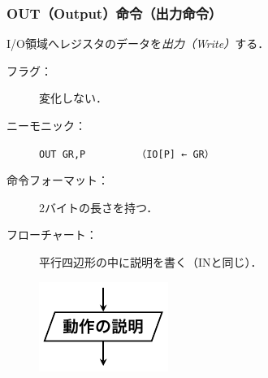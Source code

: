 \documentclass{beamer}                 %
\begin{document}
\begin{frame}
  \frametitle{OUT（Output）命令（出力命令）}
  I/O領域へレジスタのデータを\emph{出力（Write）}する．
  \vfill
  \begin{description}
  \item[フラグ：] 変化しない．
    \vfill
  \item[ニーモニック：]\texttt{OUT GR,P}~~~~~~~~~\texttt{（IO[P] ← GR）}
    \vfill
  \item[命令フォーマット：] 2バイトの長さを持つ．\\
    {\small{}}
    \vfill
  \item[フローチャート：] 平行四辺形の中に説明を書く（INと同じ）．\\
    \centerline{\includegraphics[scale=0.8]{../Tikz/in.pdf}}
    \vfill
  \end{description}
  \vfill
\end{frame}
\end{document}
